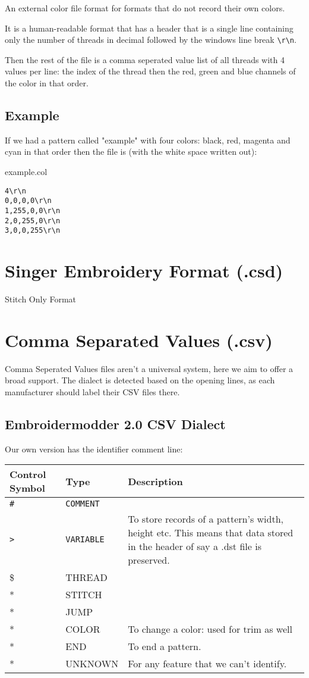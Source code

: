 An external color file format for formats that do not record their own colors. 

It is a human-readable format that has a header that is a single line containing only the number of threads in decimal followed by the windows line break \texttt{\textbackslash{}r\textbackslash{}n}.

Then the rest of the file is a comma seperated value list of all threads with 4 values per line: the index of the thread then the red, green and blue channels of the color in that order.

\subsection{Example}

If we had a pattern called "example" with four colors: black, red, magenta and cyan in that order then the file is (with the white space written out):

example.col

\begin{verbatim}
4\r\n
0,0,0,0\r\n
1,255,0,0\r\n
2,0,255,0\r\n
3,0,0,255\r\n
\end{verbatim}

\section{Singer Embroidery Format (.csd)}

Stitch Only Format

\section{Comma Separated Values (.csv)}

Comma Seperated Values files aren't a universal system, here we aim to
offer a broad support. The dialect is detected based on the opening lines,
as each manufacturer should label their CSV files there.

\subsection{Embroidermodder 2.0 CSV Dialect}

Our own version has the identifier comment line:

\begin{longtable}{l l p{8cm}}
Control Symbol & Type & Description \\
\hline
\texttt{\#} & \texttt{COMMENT} & \\
\texttt{>} & \texttt{VARIABLE} & To store records of a pattern's width, height etc. This means that data stored in the header of say a .dst file is preserved. \\
\$ & THREAD & \\
* & STITCH & \\
* & JUMP & \\
* & COLOR & To change a color: used for trim as well \\
* & END & To end a pattern. \\
* & UNKNOWN & For any feature that we can't identify.
\end{longtable}

